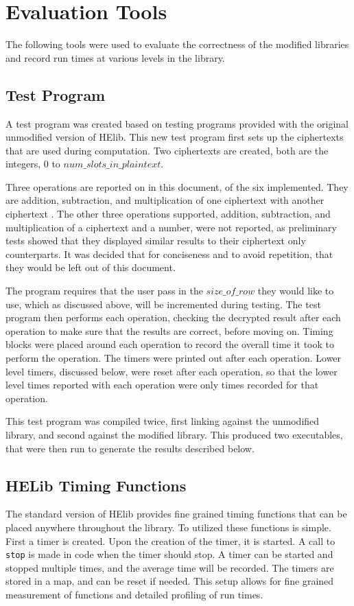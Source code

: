 \section{Evaluation Tools} \label{sec:EvaluationTools}
The following tools were used to evaluate the correctness of the modified libraries and record run times at various levels in the library.

\subsection{Test Program}
A test program was created based on testing programs provided with the original unmodified version of HElib. This new test program first sets up the ciphertexts that are used during computation. Two ciphertexts are created, both are the integers, $0$ to $ num\_slots\_in\_plaintext$. 

Three operations are reported on in this document, of the six implemented. They are addition, subtraction, and multiplication of one ciphertext with another ciphertext . The other three operations supported, addition, subtraction, and multiplication of a ciphertext and a number, were not reported, as preliminary tests showed that they displayed similar results to their ciphertext only counterparts. It was decided that for conciseness and to avoid repetition, that they would be left out of this document.

The program requires that the user pass in the $size\_of\_row$ they would like to use, which as discussed above, will be incremented during testing. The test program then performs each operation, checking the decrypted result after each operation to make sure that the results are correct, before moving on. Timing blocks were placed around each operation to record the overall time it took to perform the operation. The timers were printed out after each operation. Lower level timers, discussed below, were reset after each operation, so that the lower level times reported with each operation were only times recorded for that operation.

This test program was compiled twice, first linking against the unmodified library, and second against the modified library. This produced two executables, that were then run to generate the results described below.

\subsection{HELib Timing Functions}
The standard version of HElib provides fine grained timing functions that can be placed anywhere throughout the library. To utilized these functions is simple. First a timer is created. Upon the creation of the timer, it is started. A call to \verb|stop| is made in code when the timer should stop. A timer can be started and stopped multiple times, and the average time will be recorded. The timers are stored in a map, and can be reset if needed. This setup allows for fine grained measurement of functions and detailed profiling of run times. 

